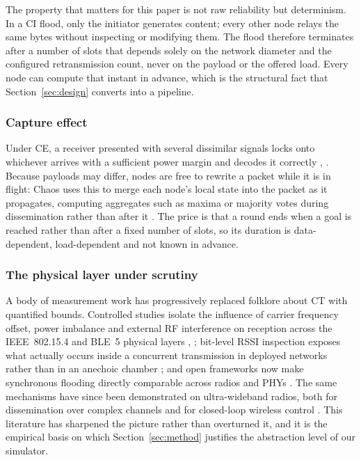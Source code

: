 \documentclass[journal]{IEEEtran}
\newcommand{\CI}{CI}                      %
\newcommand{\CE}{CE}                      %
\begin{document}
The property that matters for this paper is not raw reliability but
determinism. In a \CI{} flood, only the initiator generates content; every
other node relays the same bytes without inspecting or modifying them.
The flood therefore terminates after a number of slots that depends solely
on the network diameter and the configured retransmission count, never on
the payload or the offered load. Every node can compute that instant in
advance, which is the structural fact that
Section~\ref{sec:design} converts into a pipeline.

\subsubsection{Capture effect}
Under \CE, a receiver presented with several dissimilar signals locks onto
whichever arrives with a sufficient power margin and decodes it correctly
\cite{wilhelm14reception}, \cite{zimmerling20survey}. Because payloads may
differ, nodes are free to rewrite a packet while it is in flight: Chaos
uses this to merge each node's local state into the packet as it
propagates, computing aggregates such as maxima or majority votes during
dissemination rather than after it \cite{landsiedel13chaos}. The price is
that a round ends when a goal is reached rather than after a fixed number
of slots, so its duration is data-dependent, load-dependent and not known
in advance.

\subsubsection{The physical layer under scrutiny}
A body of measurement work has progressively replaced folklore about CT
with quantified bounds. Controlled studies isolate the influence of
carrier frequency offset, power imbalance and external RF interference on
reception across the IEEE~802.15.4 and BLE~5 physical layers
\cite{baddeley20phy}, \cite{baddeley23understanding}; bit-level RSSI
inspection exposes what actually occurs inside a concurrent transmission
in deployed networks rather than in an anechoic chamber
\cite{herrmann22rssispy}; and open frameworks now make synchronous
flooding directly comparable across radios and PHYs
\cite{baddeley22osf}. The same mechanisms have since been demonstrated on
ultra-wideband radios, both for dissemination over complex channels
\cite{schuh24uwb} and for closed-loop wireless control
\cite{trobinger24uwbcontrol}. This literature has sharpened the picture
rather than overturned it, and it is the empirical basis on which
Section~\ref{sec:method} justifies the abstraction level of our simulator.
\end{document}
